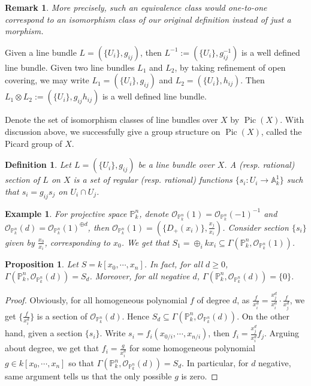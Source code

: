 \documentclass{ctexart}
\newtheorem{definition}{Definition}[section]
\newtheorem{remark}{Remark}[section]
\newtheorem{proposition}{Proposition}[section]
\newtheorem{example}{Example}[section]
\newcommand{\picardscheme}{\operatorname{Pic}}
\begin{document}
\begin{remark}
    More precisely, such an equivalence class would one-to-one correspond to an isomorphism class of our original definition instead of just a morphism.
\end{remark}
Given a line bundle $L = (\{U_{i}\}, g_{ij})$, then $L^{-1} := (\{U_{i}\}, g_{ij}^{-1})$ is a well defined line bundle.
Given two line bundles $L_{1}$ and $L_{2}$, by taking refinement of open covering, 
we may write $L_{1} = (\{U_{i}\}, g_{ij})$ and $L_{2} = (\{U_{i}\}, h_{ij})$.
Then $L_{1} \otimes L_{2} := (\{U_{i}\}, g_{ij}h_{ij})$ is a well defined line bundle.
\par
Denote the set of isomorphism classes of line bundles over $X$ by $\picardscheme(X)$.
With discussion above, we successfully give a group structure on $\picardscheme(X)$, called the Picard group of $X$.
\begin{definition}
    Let $L = (\{U_{i}\}, g_{ij})$ be a line bundle over $X$.
    A (resp. rational) section of $L$ on $X$ is a set of regular (resp. rational) functions $\{s_{i}: U_{i} \rightarrow \mathbb{A}_{k}^{1}\}$ such that $s_{i} = g_{ij}s_{j}$ on $U_{i} \cap U_{j}$.
\end{definition}
\begin{example}
    For projective space $\mathbb{P}_{k}^{n}$, denote $\mathcal{O}_{\mathbb{P}_{k}^{n}}(1) = \mathcal{O}_{\mathbb{P}_{k}^{n}}(-1)^{-1}$ and $\mathcal{O}_{\mathbb{P}_{k}^{n}}(d) = \mathcal{O}_{\mathbb{P}_{k}^{n}}(1)^{\oplus d}$,
    then $\mathcal{O}_{\mathbb{P}_{k}^{n}}(1) = (\{D_{+}(x_{i})\}, \frac{x_{j}}{x_{i}})$.
    Consider section $\{s_{i}\}$ given by $\frac{x_{0}}{x_{i}}$, corresponding to $x_{0}$.
    We get that $S_{1} = \oplus_{i} kx_{i} \subseteq \Gamma(\mathbb{P}_{k}^{n}, \mathcal{O}_{\mathbb{P}_{k}^{n}}(1))$.
\end{example}
\begin{proposition}
    Let $S = k[x_{0}, \cdots, x_{n}]$.
    In fact, for all $d \ge 0$, $\Gamma(\mathbb{P}_{k}^{n}, \mathcal{O}_{\mathbb{P}_{k}^{n}}(d)) = S_{d}$.
    Moreover, for all negative $d$, $\Gamma(\mathbb{P}_{k}^{n}, \mathcal{O}_{\mathbb{P}_{k}^{n}}(d)) = \{0\}$.
    \label{Proposition 7.1}
\end{proposition}
\begin{proof}
    Obviously, for all homogeneous polynomial $f$ of degree $d$, as $\frac{f}{x_{i}^{d}} = \frac{x_{j}^{d}}{x_{i}^{d}} \cdot \frac{f}{x_{j}^{d}}$,
    we get $\{\frac{f}{x_{i}^{d}}\}$ is a section of $\mathcal{O}_{\mathbb{P}_{k}^{n}}(d)$.
    Hence $S_{d} \subseteq \Gamma(\mathbb{P}_{k}^{n}, \mathcal{O}_{\mathbb{P}_{k}^{n}}(d))$.
    On the other hand, given a section $\{s_{i}\}$.
    Write $s_{i} = f_{i}(x_{0/i}, \cdots, x_{n/i})$, then $f_{i} = \frac{x_{j}^{d}}{x_{i}^{d}}f_{j}$.
    Arguing about degree, we get that $f_{i} = \frac{g}{x_{i}^{d}}$ for some homogeneous polynomial $g\in k[x_{0}, \cdots, x_{n}]$ so that $\Gamma(\mathbb{P}_{k}^{n}, \mathcal{O}_{\mathbb{P}_{k}^{n}}(d)) = S_{d}$.
    In particular, for $d$ negative, same argument tells us that the only possible $g$ is zero.
\end{proof}
\end{document}
